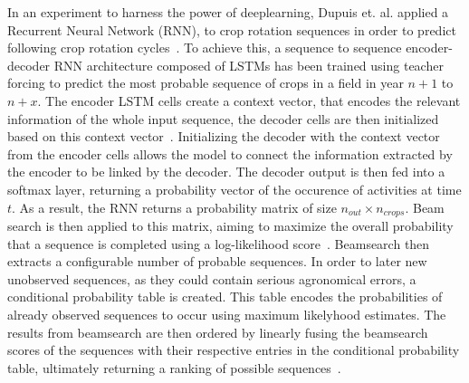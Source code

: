 \documentclass{Academic}
\begin{document}
    In an experiment to harness the power of deeplearning, Dupuis et. al. applied a Recurrent Neural Network (RNN), to crop rotation sequences in order to predict following crop rotation cycles~\cite{dupuis_performances_2023}. To achieve this, a sequence to sequence encoder-decoder RNN architecture composed of LSTMs has been trained using teacher forcing to predict the most probable sequence of crops in a field in year $n+1$ to $n+x$. The encoder LSTM cells create a context vector, that encodes the relevant information of the whole input sequence, the decoder cells are then initialized based on this context vector~\cite{dupuis_methodology_2023}. Initializing the decoder with the context vector from the encoder cells allows the model to connect the information extracted by the encoder to be linked by the decoder. The decoder output is then fed into a softmax layer, returning a probability vector of the occurence of activities at time $t$. As a result, the RNN returns a probability matrix of size $n_{out}\times n_{crops}$. Beam search is then applied to this matrix, aiming to maximize the overall probability that a sequence is completed using a log-likelihood score~\cite{dupuis_methodology_2023}. Beamsearch then extracts a configurable number of probable sequences. In order to later new unobserved sequences, as they could contain serious agronomical errors, a conditional probability table is created. This table encodes the probabilities of already observed sequences to occur using maximum likelyhood estimates. The results from beamsearch are then ordered by linearly fusing the beamsearch scores of the sequences with their respective entries in the conditional probability table, ultimately returning a ranking of possible sequences~\cite{dupuis_performances_2023}.
\end{document}
